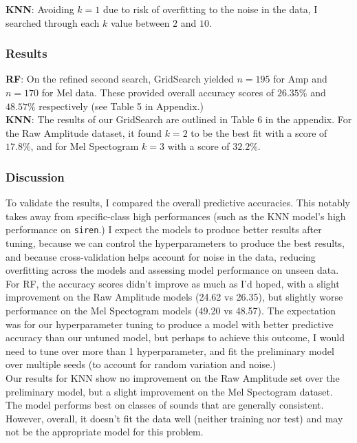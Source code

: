 \documentclass[11pt]{article}
\begin{document}
\noindent \textbf{KNN}: Avoiding $k=1$ due to risk of overfitting to the noise in the data, I searched through each $k$ value between $2$ and $10$. 

\subsubsection{Results}
\noindent \textbf{RF}: On the refined second search, GridSearch yielded $n = 195$ for Amp and $n = 170$ for Mel data. These provided overall accuracy scores of $26.35\%$ and $48.57\%$ respectively (see Table 5 in Appendix.)\\

\noindent \textbf{KNN}: The results of our GridSearch are outlined in Table 6 in the appendix. For the Raw Amplitude dataset, it found $k=2$ to be the best fit with a score of $17.8\%$, and for Mel Spectogram $k=3$ with a score of $32.2\%$.

\subsubsection{Discussion}

To validate the results, I compared the overall predictive accuracies. This notably takes away from specific-class high performances (such as the KNN model's high performance on \texttt{siren}.) I expect the models to produce better results after tuning, because we can control the hyperparameters to produce the best results, and because cross-validation helps account for noise in the data, reducing overfitting across the models and assessing model performance on unseen data.\\

\noindent For RF, the accuracy scores didn't improve as much as I'd hoped, with a slight improvement on the Raw Amplitude models (24.62 vs 26.35), but slightly worse performance on the Mel Spectogram models (49.20 vs 48.57). The expectation was for our hyperparameter tuning to produce a model with better predictive accuracy than our untuned model, but perhaps to achieve this outcome, I would need to tune over more than 1 hyperparameter, and fit the preliminary model over multiple seeds (to account for random variation and noise.)\\

\noindent Our results for KNN show no improvement on the Raw Amplitude set over the preliminary model, but a slight improvement on the Mel Spectogram dataset. The model performs best on classes of sounds that are generally consistent. However, overall, it doesn't fit the data well (neither training nor test) and may not be the appropriate model for this problem.
\end{document}
